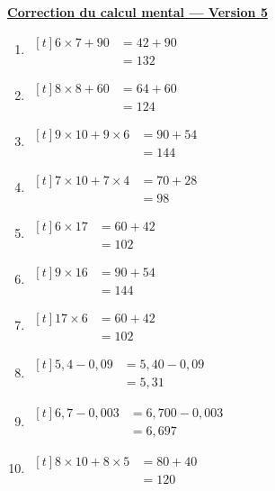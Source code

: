 \documentclass[12pt,a4paper]{article}
\newcommand{\titreversion}[1]{%
  \begin{center}%
    {\Large\underline{\textbf{#1}}}%
  \end{center}%
}
\begin{document}
\titreversion{Correction du calcul mental --- Version 5}
\begin{enumerate}
\item {$\begin{aligned}[t]
6\times 7+90 &= 42+90\\
             &= \boxed{132}
\end{aligned}$}
\item {$\begin{aligned}[t]
8\times 8+60 &= 64+60\\
             &= \boxed{124}
\end{aligned}$}
\item {$\begin{aligned}[t]
9\times 10+9\times 6 &= 90+54\\
                     &= \boxed{144}
\end{aligned}$}
\item {$\begin{aligned}[t]
7\times 10+7\times 4 &= 70+28\\
                     &= \boxed{98}
\end{aligned}$}
\item {$\begin{aligned}[t]
6\times 17 &= 60+42\\
           &= \boxed{102}
\end{aligned}$}
\item {$\begin{aligned}[t]
9\times 16 &= 90+54\\
           &= \boxed{144}
\end{aligned}$}
\item {$\begin{aligned}[t]
17\times 6 &= 60+42\\
           &= \boxed{102}
\end{aligned}$}
\item {$\begin{aligned}[t]
5{,}4-0{,}09 &= 5{,}40-0{,}09\\
             &= \boxed{5{,}31}
\end{aligned}$}
\item {$\begin{aligned}[t]
6{,}7-0{,}003 &= 6{,}700-0{,}003\\
              &= \boxed{6{,}697}
\end{aligned}$}
\item {$\begin{aligned}[t]
8\times 10+8\times 5 &= 80+40\\
                     &= \boxed{120}
\end{aligned}$}
\end{enumerate}
\newpage
\end{document}
